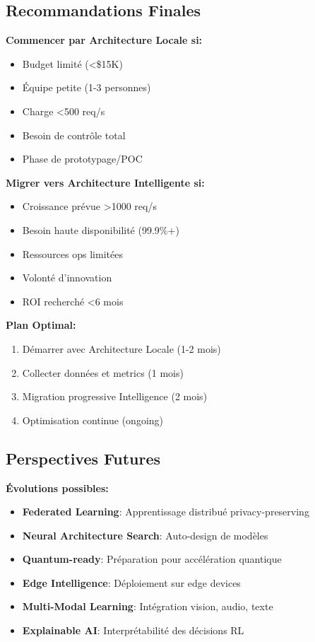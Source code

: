 \documentclass[12pt,a4paper]{article}
\begin{document}
\subsection{Recommandations Finales}

\textbf{Commencer par Architecture Locale si:}
\begin{itemize}
    \item Budget limité (<\$15K)
    \item Équipe petite (1-3 personnes)
    \item Charge <500 req/s
    \item Besoin de contrôle total
    \item Phase de prototypage/POC
\end{itemize}

\textbf{Migrer vers Architecture Intelligente si:}
\begin{itemize}
    \item Croissance prévue >1000 req/s
    \item Besoin haute disponibilité (99.9\%+)
    \item Ressources ops limitées
    \item Volonté d'innovation
    \item ROI recherché <6 mois
\end{itemize}

\textbf{Plan Optimal:}
\begin{enumerate}
    \item Démarrer avec Architecture Locale (1-2 mois)
    \item Collecter données et metrics (1 mois)
    \item Migration progressive Intelligence (2 mois)
    \item Optimisation continue (ongoing)
\end{enumerate}

\subsection{Perspectives Futures}

\textbf{Évolutions possibles:}
\begin{itemize}
    \item \textbf{Federated Learning}: Apprentissage distribué privacy-preserving
    \item \textbf{Neural Architecture Search}: Auto-design de modèles
    \item \textbf{Quantum-ready}: Préparation pour accélération quantique
    \item \textbf{Edge Intelligence}: Déploiement sur edge devices
    \item \textbf{Multi-Modal Learning}: Intégration vision, audio, texte
    \item \textbf{Explainable AI}: Interprétabilité des décisions RL
\end{itemize}
\end{document}
